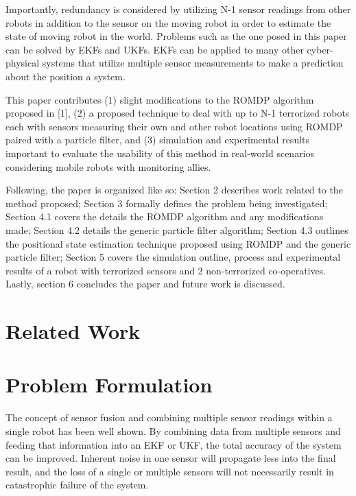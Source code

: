 \documentclass[conference]{IEEEtran}
\begin{document}
\par
Importantly, redundancy is considered by utilizing N-1 sensor readings from other robots in addition to the
sensor on the moving robot in order to estimate the state of moving robot in the world. Problems such as the one posed
in this paper can be solved by EKFs and UKFs. EKFs can be applied to many other cyber-physical systems that utilize
multiple sensor measurements to make a prediction about the position a system.
\par
This paper contributes (1) slight modifications to the ROMDP algorithm proposed in [1], (2) a proposed technique
to deal with up to N-1 terrorized robots each with sensors measuring their own and other robot locations
using ROMDP paired with a particle filter, and (3) simulation and experimental results important to evaluate
the usability of this method in real-world scenarios considering mobile robots with monitoring allies.
\par
Following, the paper is organized like so: Section 2 describes work related to the method proposed; Section 3
formally defines the problem being investigated; Section 4.1 covers the details the ROMDP algorithm and any
modifications made; Section 4.2 details the generic particle filter algorithm; Section 4.3 outlines the positional
state estimation technique proposed using ROMDP and the generic particle filter; Section 5 covers the
simulation outline, process and experimental results of a robot with terrorized sensors and 2 non-terrorized
co-operatives. Lastly, section 6 concludes the paper and future work is discussed.

\section{Related Work}


\section{Problem Formulation}
The concept of sensor fusion and combining multiple sensor readings within a single robot has been well shown.
By combining data from multiple sensors and feeding that information into an EKF or UKF, the total accuracy of the
system can be improved.
Inherent noise in one sensor will propagate less into the final result, and the loss of a single or multiple sensors
will not necessarily result in catastrophic failure of the system.
\end{document}
